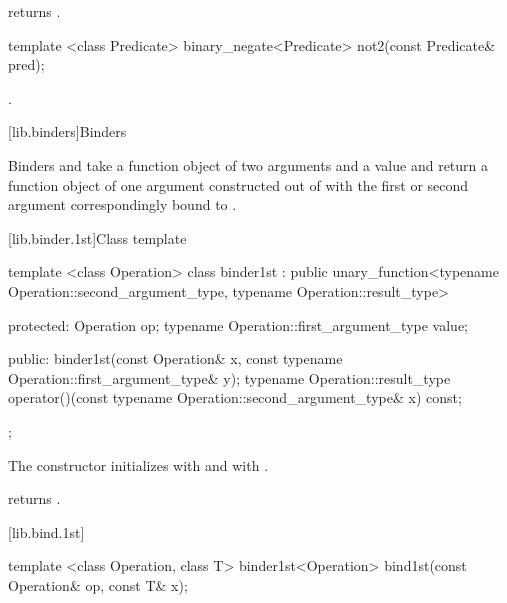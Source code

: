 \begin{itemdescr}
\pnum
{} returns .
\end{itemdescr}

%
\begin{itemdecl}
template <class Predicate>
  binary_negate<Predicate> not2(const Predicate& pred);
\end{itemdecl}

\begin{itemdescr}
\pnum
\returns
{}.
\end{itemdescr}

[lib.binders]{Binders}

\pnum
Binders  and  take a function object 
of two arguments and a value  and return a function object of one
argument constructed out of  with the first or second argument
correspondingly bound to .

[lib.binder.1st]{Class template }

%
\begin{itemdecl}
  template <class Operation>
  class binder1st
    : public unary_function<typename Operation::second_argument_type,
                            typename Operation::result_type> {
  protected:
    Operation                      op;
    typename Operation::first_argument_type value;

  public:
    binder1st(const Operation& x,
              const typename Operation::first_argument_type& y);
    typename Operation::result_type
      operator()(const typename Operation::second_argument_type& x) const;
  };
\end{itemdecl}

\begin{itemdescr}
\pnum
The constructor initializes  with  and 
with .

\pnum
{} returns .
\end{itemdescr}

[lib.bind.1st]{}

%
\begin{itemdecl}
template <class Operation, class T>
  binder1st<Operation> bind1st(const Operation& op, const T& x);
\end{itemdecl}

